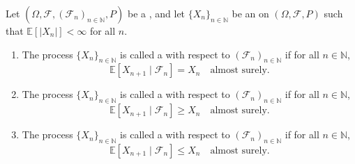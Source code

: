 \begin{definition} \label{definition:martingale_submartingale_supermartingale}
Let $(\Omega, \mathcal{F}, (\mathcal{F}_n)_{n \in \mathbb{N}}, P)$ be a , and let $\{X_n\}_{n \in \mathbb{N}}$ be an  on $(\Omega, \mathcal{F}, P)$ such that $\mathbb{E}[|X_n|] < \infty$ for all $n$.

\begin{enumerate}
    \item The process $\{X_n\}_{n \in \mathbb{N}}$ is called a  with respect to $(\mathcal{F}_n)_{n \in \mathbb{N}}$ if for all $n \in \mathbb{N}$,
    $$\mathbb{E}[X_{n+1} \mid \mathcal{F}_n] = X_n \quad \text{almost surely.}$$

    \item The process $\{X_n\}_{n \in \mathbb{N}}$ is called a  with respect to $(\mathcal{F}_n)_{n \in \mathbb{N}}$ if for all $n \in \mathbb{N}$,
    $$\mathbb{E}[X_{n+1} \mid \mathcal{F}_n] \geq X_n \quad \text{almost surely.}$$

    \item The process $\{X_n\}_{n \in \mathbb{N}}$ is called a  with respect to $(\mathcal{F}_n)_{n \in \mathbb{N}}$ if for all $n \in \mathbb{N}$,
    $$\mathbb{E}[X_{n+1} \mid \mathcal{F}_n] \leq X_n \quad \text{almost surely.}$$
\end{enumerate}
\end{definition}
